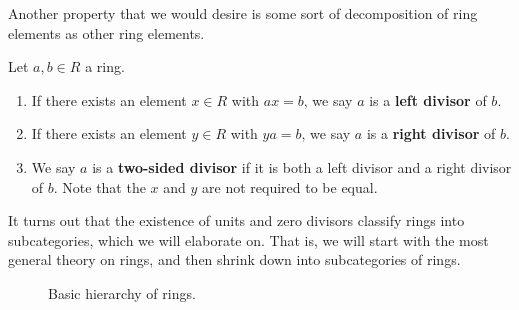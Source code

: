   Another property that we would desire is some sort of decomposition of ring elements as other ring elements. 

  \begin{definition}
    Let $a, b \in R$ a ring. 
    \begin{enumerate}
      \item If there exists an element $x \in R$ with $ax = b$, we say $a$ is a \textbf{left divisor} of $b$. 

      \item If there exists an element $y \in R$ with $ya = b$, we say $a$ is a \textbf{right divisor} of $b$. 

      \item We say $a$ is a \textbf{two-sided divisor} if it is both a left divisor and a right divisor of $b$. Note that the $x$ and $y$ are not required to be equal. 
    \end{enumerate}
  \end{definition}

  It turns out that the existence of units and zero divisors classify rings into subcategories, which we will elaborate on. That is, we will start with the most general theory on rings, and then shrink down into subcategories of rings. 

  \begin{figure}[H]
    \centering 
    \caption{Basic hierarchy of rings.} 
    \label{fig:ring_hierarchy}
  \end{figure} 

